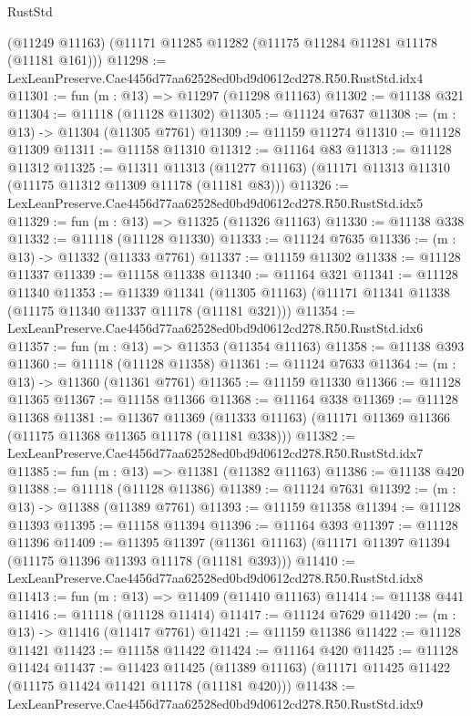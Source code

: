 \begin{lexlean}{RustStd}
\begin{coremodule}
    (@11249 @11163)
    (@11171 @11285 @11282 (@11175 @11284 @11281 @11178 (@11181 @161)))
@11298 := LexLeanPreserve.Cae4456d77aa62528ed0bd9d0612cd278.R50.RustStd.idx4
@11301 := fun (m : @13) => @11297 (@11298 @11163)
@11302 := @11138 @321
@11304 := @11118 (@11128 @11302)
@11305 := @11124 @7637
@11308 := (m : @13) -> @11304 (@11305 @7761)
@11309 := @11159 @11274
@11310 := @11128 @11309
@11311 := @11158 @11310
@11312 := @11164 @83
@11313 := @11128 @11312
@11325 := @11311
    @11313
    (@11277 @11163)
    (@11171 @11313 @11310 (@11175 @11312 @11309 @11178 (@11181 @83)))
@11326 := LexLeanPreserve.Cae4456d77aa62528ed0bd9d0612cd278.R50.RustStd.idx5
@11329 := fun (m : @13) => @11325 (@11326 @11163)
@11330 := @11138 @338
@11332 := @11118 (@11128 @11330)
@11333 := @11124 @7635
@11336 := (m : @13) -> @11332 (@11333 @7761)
@11337 := @11159 @11302
@11338 := @11128 @11337
@11339 := @11158 @11338
@11340 := @11164 @321
@11341 := @11128 @11340
@11353 := @11339
    @11341
    (@11305 @11163)
    (@11171 @11341 @11338 (@11175 @11340 @11337 @11178 (@11181 @321)))
@11354 := LexLeanPreserve.Cae4456d77aa62528ed0bd9d0612cd278.R50.RustStd.idx6
@11357 := fun (m : @13) => @11353 (@11354 @11163)
@11358 := @11138 @393
@11360 := @11118 (@11128 @11358)
@11361 := @11124 @7633
@11364 := (m : @13) -> @11360 (@11361 @7761)
@11365 := @11159 @11330
@11366 := @11128 @11365
@11367 := @11158 @11366
@11368 := @11164 @338
@11369 := @11128 @11368
@11381 := @11367
    @11369
    (@11333 @11163)
    (@11171 @11369 @11366 (@11175 @11368 @11365 @11178 (@11181 @338)))
@11382 := LexLeanPreserve.Cae4456d77aa62528ed0bd9d0612cd278.R50.RustStd.idx7
@11385 := fun (m : @13) => @11381 (@11382 @11163)
@11386 := @11138 @420
@11388 := @11118 (@11128 @11386)
@11389 := @11124 @7631
@11392 := (m : @13) -> @11388 (@11389 @7761)
@11393 := @11159 @11358
@11394 := @11128 @11393
@11395 := @11158 @11394
@11396 := @11164 @393
@11397 := @11128 @11396
@11409 := @11395
    @11397
    (@11361 @11163)
    (@11171 @11397 @11394 (@11175 @11396 @11393 @11178 (@11181 @393)))
@11410 := LexLeanPreserve.Cae4456d77aa62528ed0bd9d0612cd278.R50.RustStd.idx8
@11413 := fun (m : @13) => @11409 (@11410 @11163)
@11414 := @11138 @441
@11416 := @11118 (@11128 @11414)
@11417 := @11124 @7629
@11420 := (m : @13) -> @11416 (@11417 @7761)
@11421 := @11159 @11386
@11422 := @11128 @11421
@11423 := @11158 @11422
@11424 := @11164 @420
@11425 := @11128 @11424
@11437 := @11423
    @11425
    (@11389 @11163)
    (@11171 @11425 @11422 (@11175 @11424 @11421 @11178 (@11181 @420)))
@11438 := LexLeanPreserve.Cae4456d77aa62528ed0bd9d0612cd278.R50.RustStd.idx9

\end{coremodule}
\end{lexlean}
